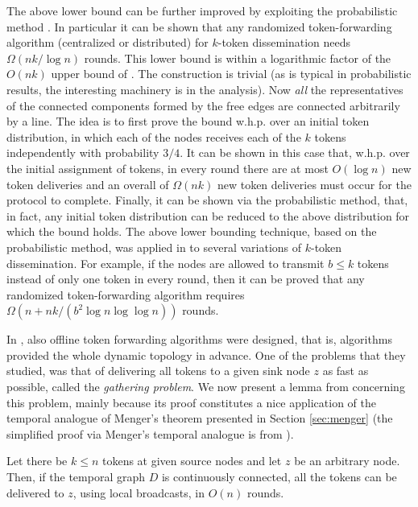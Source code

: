 \documentclass[oribibl, 11pt]{llncs}
\begin{document}
The above lower bound can be further improved by exploiting the probabilistic method \cite{DPRS13}. In particular it can be shown that any randomized token-forwarding algorithm (centralized or distributed) for $k$-token dissemination needs $\Omega(nk/\log n)$ rounds. This lower bound is within a logarithmic factor of the $O(nk)$ upper bound of \cite{KLO10}. The construction is trivial (as is typical in probabilistic results, the interesting machinery is in the analysis). Now \emph{all} the representatives of the connected components formed by the free edges are connected arbitrarily by a line. The idea is to first prove the bound w.h.p. over an initial token distribution, in which each of the nodes receives each of the $k$ tokens independently with probability $3/4$. It can be shown in this case that, w.h.p. over the initial assignment of tokens, in every round there are at most $O(\log n)$ new token deliveries and an overall of $\Omega(nk)$ new token deliveries must occur for the protocol to complete. Finally, it can be shown via the probabilistic method, that, in fact, any initial token distribution can be reduced to the above distribution for which the bound holds. The above lower bounding technique, based on the probabilistic method, was applied in \cite{HK12} to several variations of $k$-token dissemination. For example, if the nodes are allowed to transmit $b\leq k$ tokens instead of only one token in every round, then it can be proved that any randomized token-forwarding algorithm requires $\Omega(n + nk/(b^2 \log n \log \log n))$ rounds.

In \cite{DPRS13}, also offline token forwarding algorithms were designed, that is, algorithms provided the whole dynamic topology in advance. One of the problems that they studied, was that of delivering all tokens to a given sink node $z$ as fast as possible, called the \emph{gathering problem}. We now present a lemma from \cite{DPRS13} concerning this problem, mainly because its proof constitutes a nice application of the temporal analogue of Menger's theorem presented in Section \ref{sec:menger} (the simplified proof via Menger's temporal analogue is from \cite{MMCS13}).

\begin{lemma} [DPRS13]
Let there be $k\leq n$ tokens at given source nodes and let $z$ be an arbitrary node. Then, if the temporal graph $D$ is continuously connected, all the tokens can be delivered to $z$, using local broadcasts, in $O(n)$ rounds.
\end{lemma}
\end{document}
